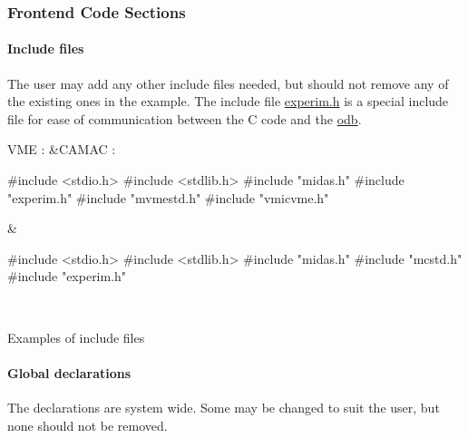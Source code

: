 \par
  \par
 \label{index_end}
\hypertarget{index_end}{}
 \subsubsection{Frontend Code Sections}\label{FE_code_sections}
\par
  \par
\hypertarget{FE_code_sections_FE_includes}{}\paragraph{Include files}\label{FE_code_sections_FE_includes}
The user may add any other include files needed, but should not remove any of the existing ones in the example. The include file \hyperlink{RC_Hot_Link_RC_experim_dot_h}{experim.h} is a special include file for ease of communication between the C code and the \hyperlink{F_MainElements_F_Online_Database_overview}{odb}.

\begin{table}[h]\begin{TabularC}{2}
\hline
VME :  &CAMAC :  \\

\begin{DoxyCode}
#include <stdio.h>
#include <stdlib.h>
#include "midas.h"
#include "experim.h"
#include "mvmestd.h"
#include "vmicvme.h"
\end{DoxyCode}
  &
\begin{DoxyCode}
#include <stdio.h>
#include <stdlib.h>
#include "midas.h"
#include "mcstd.h"
#include "experim.h"
\end{DoxyCode}
 \\
\end{TabularC}
\centering
\caption{Examples of include files }
\end{table}


\par


\par
 \hypertarget{FE_code_sections_FE_global}{}\paragraph{Global declarations}\label{FE_code_sections_FE_global}
The declarations are system wide. Some may be changed to suit the user, but none should not be removed.


